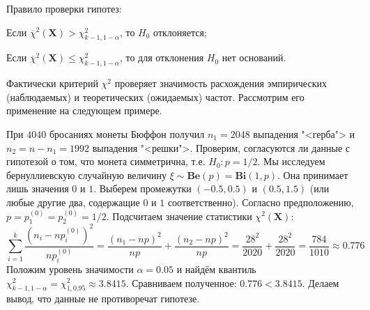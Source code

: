Правило проверки гипотез:
\begin{compactlist}
    \item Если $\overline{\chi}^{2} \left(\mathbf{X}\right)>\chi^{2}_{k-1, 1 - \alpha}$, то $H_0$ отклоняется;
    \item Если $\overline{\chi}^{2} \left(\mathbf{X}\right) \leqslant \chi^{2}_{k-1, 1 - \alpha}$, то для отклонения $H_0$ нет оснований.
\end{compactlist}
\medskip
\begin{center}
\end{center}

Фактически критерий $\chi^{2}$ проверяет значимость расхождения эмпирических (наблюдаемых) и теоретических (ожидаемых) частот. 
Рассмотрим его применение на следующем примере.

\begin{exmp}
    При $4040$ бросаниях монеты Бюффон получил $n_1 = 2048$ выпадения "<герба"> и $n_2 = n - n_1 = 1992$ выпадения "<решки">.
    Проверим, согласуются ли данные с гипотезой о том, что монета симметрична, т.е. $H_0 \colon p = 1/2$.
    Мы исследуем бернуллиевскую случайную величину $\xi \sim \mathbf{Be}(p) = \mathbf{Bi}(1, p)$.
    Она принимает лишь значения $0$ и $1$.
    Выберем промежутки $(-0.5, 0.5)$ и $(0.5, 1.5)$ (или любые другие два, содержащие $0$ и $1$ соответственно).
    Согласно предположению, $p = p_1^{(0)} = p_2^{(0)} = 1/2$.
    Подсчитаем значение статистики $\chi^2(\mathbf{X})$:
    \begin{equation*}
        \sum\limits_{i = 1}^{k} \frac{(n_i - np_i^{(0)})^2}{np_i^{(0)}} = 
        \frac{(n_1 - np)^2}{np} + \frac{(n_2 - np)^2}{np} = 
        \frac{28^2}{2020} + \frac{28^2}{2020} = \frac{784}{1010} \approx 0.776
    \end{equation*}
    Положим уровень значимости $\alpha = 0.05$ и найдём квантиль $\chi^2_{k-1, 1 - \alpha} = \chi^2_{1, 0.95} \approx 3.8415$.
    Сравниваем полученное: $0.776 < 3.8415$.
    Делаем вывод, что данные не противоречат гипотезе.
\end{exmp}

